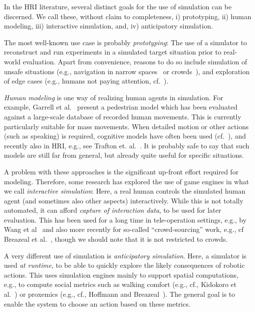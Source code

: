\documentclass{llncs}
\begin{document}
In the HRI literature, several distinct goals for the use of simulation can be 
discerned. We call these, without claim to completeness, i) prototyping, 
ii) human modeling, iii) interactive simulation, and, iv) anticipatory simulation.  

The most well-known use case is probably \emph{prototyping}: The use of a simulator
to reconstruct and run experiments in a simulated target situation prior to real-world
evaluation. Apart from convenience, reasons to do so include simulation of unsafe
situations (e.g., navigation in narrow spaces~\cite{sisbot2007human,kidokoro2013will} or 
crowds~\cite{henry2010learning}), and exploration of edge cases (e.g., humans 
not paying attention, cf.~\cite{knepper2012pedestrian,guzzi2013human}).

\emph{Human modeling} is one way of realizing human agents in simulation. For example,
Garrell et al.~\cite{garrell2010model} present a pedestrian model which has been
evaluated against a large-scale database of recorded human movements. This is
currently particularly suitable for mass movements. When detailed
motion or other actions (such as speaking) is required, cognitive models
have often been used (cf.~\cite{sun2006cognition}), 
and recently also in HRI, e.g., see Trafton et. al.~\cite{trafton2013act}. 
It is probably safe to say that such models are still far from general, but already 
quite useful for specific situations.

A problem with these approaches is the significant up-front effort
required for modeling. Therefore, some research has explored the use of game engines
in what we call \emph{interactive simulation}: Here, a real human controls the simulated
human agent (and sometimes also other aspects) interactively. While this is not
totally automated, it can afford
\emph{capture of interaction data}, to be used for later evaluation. This has
been used for a long time in tele-operation settings, e.g., by Wang et 
al~\cite{wang2005validating} and also more recently for so-called ``crowd-sourcing''
work, e.g., cf Breazeal et al.~\cite{breazeal2013crowdsourcing}, though we should
note that it is not restricted to crowds.

A very different use of simulation is \emph{anticipatory simulation}. Here, 
a simulator is used \emph{at runtime}, to
be able to quickly explore the likely consequences of robotic actions. This
uses simulation engines mainly to support spatial computations, e.g.,
to compute social metrics such as walking comfort (e.g., cf., Kidokoro et 
al.~\cite{kidokoro2013will}) or proxemics (e.g., cf., Hoffmann and 
Breazeal~\cite{hoffman2010effects}). The general goal is to enable the system
to choose an action based on these metrics.
\end{document}
